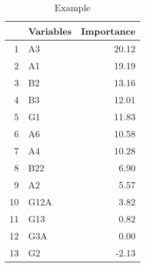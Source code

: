 \begin{table}[ht]
\centering
\begin{tabular}{rlr}
  \toprule
 & Variables & Importance \\ 
  \midrule
1 & A3 & 20.12 \\ 
  2 & A1 & 19.19 \\ 
  3 & B2 & 13.16 \\ 
  4 & B3 & 12.01 \\ 
  5 & G1 & 11.83 \\ 
  6 & A6 & 10.58 \\ 
  7 & A4 & 10.28 \\ 
  8 & B22 & 6.90 \\ 
  9 & A2 & 5.57 \\ 
  10 & G12A & 3.82 \\ 
  11 & G13 & 0.82 \\ 
  12 & G3A & 0.00 \\ 
  13 & G2 & -2.13 \\ 
   \bottomrule
\end{tabular}
\caption{Example} 
\end{table}
